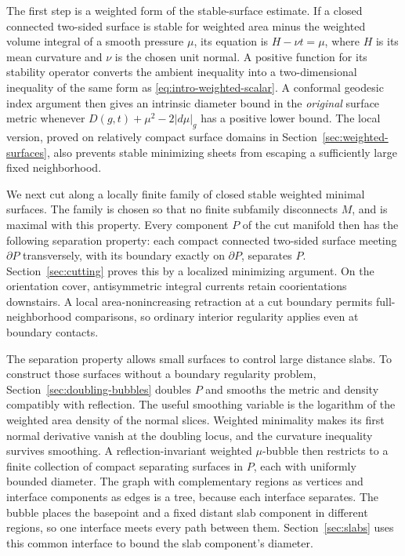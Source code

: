 The first step is a weighted form of the stable-surface estimate.
If a closed connected two-sided surface is stable for weighted area
minus the weighted volume integral of a smooth pressure $\mu$, its
equation is $H-\nu t=\mu$, where $H$ is its mean curvature and $\nu$
is the chosen unit normal. A positive function for its stability operator converts
the ambient inequality into a two-dimensional inequality of the same
form as \eqref{eq:intro-weighted-scalar}. A conformal geodesic index
argument then gives an intrinsic diameter bound in the \emph{original}
surface metric whenever
$D(g,t)+\mu^2-2|d\mu|_g$ has a positive lower bound. The local version,
proved on relatively compact surface domains in
Section~\ref{sec:weighted-surfaces}, also prevents stable minimizing
sheets from escaping a sufficiently large fixed neighborhood.

We next cut along a locally finite family of closed stable weighted
minimal surfaces. The family is chosen so that no finite subfamily
disconnects $M$, and is maximal with this property. Every component
$P$ of the cut manifold then has the following separation property:
each compact connected two-sided surface meeting $\partial P$
transversely, with its boundary exactly on $\partial P$, separates
$P$. Section~\ref{sec:cutting} proves this by a localized minimizing
argument. On the orientation cover, antisymmetric integral currents
retain coorientations downstairs. A local area-nonincreasing
retraction at a cut boundary permits full-neighborhood comparisons,
so ordinary interior regularity applies even at boundary contacts.

The separation property allows small surfaces to control large
distance slabs. To construct those surfaces without a boundary
regularity problem, Section~\ref{sec:doubling-bubbles} doubles $P$ and
smooths the metric and density compatibly with reflection. The useful
smoothing variable is the logarithm of the weighted area density of
the normal slices. Weighted minimality makes its first normal
derivative vanish at the doubling locus, and the curvature inequality
survives smoothing. A reflection-invariant weighted $\mu$-bubble then
restricts to a finite collection of compact separating surfaces in $P$,
each with uniformly bounded diameter. The graph with complementary
regions as vertices and interface components as edges is a tree,
because each interface separates. The bubble places the basepoint and
a fixed distant slab component in different regions, so one interface
meets every path between them. Section~\ref{sec:slabs} uses this common
interface to bound the slab component's diameter.

